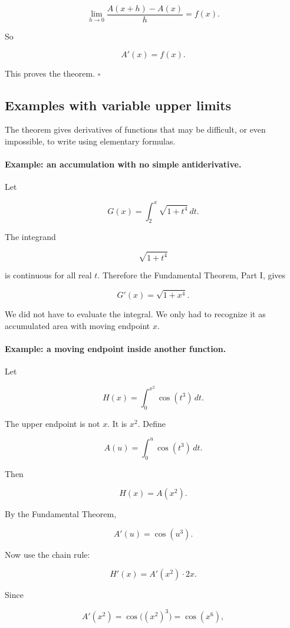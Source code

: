 \[
\lim_{h\to0}
\frac{A(x+h)-A(x)}{h}
=
f(x).
\]

So

\[
\boxed{A'(x)=f(x).}
\]

This proves the theorem. \(\square\)

\subsection{Examples with variable upper limits}
\label{subsec:examples-variable-upper-limits}

The theorem gives derivatives of functions that may be difficult, or even impossible, to
write using elementary formulas.

\paragraph{Example: an accumulation with no simple antiderivative.}
Let

\[
G(x)=\int_2^x \sqrt{1+t^4}\,dt.
\]

The integrand

\[
\sqrt{1+t^4}
\]

is continuous for all real \(t\).  Therefore the Fundamental Theorem, Part I, gives

\[
\boxed{
G'(x)=\sqrt{1+x^4}.
}
\]

We did not have to evaluate the integral.  We only had to recognize it as accumulated
area with moving endpoint \(x\).

\paragraph{Example: a moving endpoint inside another function.}
Let

\[
H(x)=\int_0^{x^2} \cos(t^3)\,dt.
\]

The upper endpoint is not \(x\).  It is \(x^2\).  Define

\[
A(u)=\int_0^u \cos(t^3)\,dt.
\]

Then

\[
H(x)=A(x^2).
\]

By the Fundamental Theorem,

\[
A'(u)=\cos(u^3).
\]

Now use the chain rule:

\[
H'(x)=A'(x^2)\cdot 2x.
\]

Since

\[
A'(x^2)=\cos\bigl((x^2)^3\bigr)=\cos(x^6),
\]

